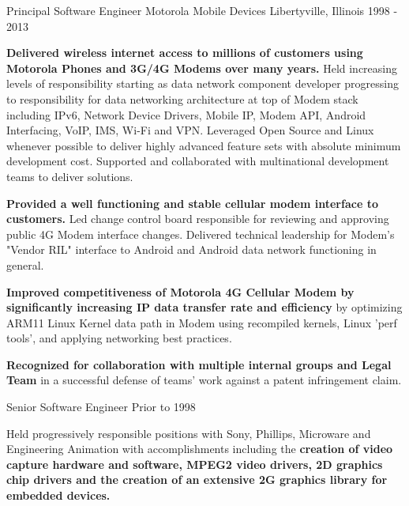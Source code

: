 \begin{cventries}
  \cventry
    {Principal Software Engineer} %
    {Motorola Mobile Devices} %
    {Libertyville, Illinois} %
    {1998 - 2013} %
    {
      \begin{cvitems} %
      \item {\textbf{Delivered wireless internet access to millions of customers
        using Motorola Phones and 3G/4G Modems over many years.}
          Held increasing levels of responsibility starting as data network
          component developer progressing to responsibility for data networking
          architecture at top of Modem stack including IPv6, Network Device
          Drivers, Mobile IP, Modem API, Android Interfacing, VoIP, IMS, Wi-Fi and VPN.
          Leveraged Open Source and Linux whenever possible to deliver highly advanced feature sets with absolute minimum development cost.
          Supported and collaborated with multinational development teams to deliver solutions.}
        \item {\textbf{Provided a well functioning and stable cellular modem interface to customers.}
  Led change control board responsible for reviewing and approving public 4G Modem interface changes.  
  Delivered technical leadership for Modem's "Vendor RIL" interface to Android and Android data network functioning in general.}
        \item {\textbf{Improved competitiveness of Motorola 4G Cellular Modem by significantly increasing IP data transfer rate and efficiency} 
          by optimizing ARM11 Linux Kernel data path in Modem using recompiled kernels, Linux 'perf tools', and applying networking best practices.}
        \item {\textbf{Recognized for collaboration with multiple internal groups and Legal Team }
           in a successful defense of teams' work against a patent infringement claim.
           }
      \end{cvitems}
    }

  \cventry
    {Senior Software Engineer} %
    {Prior to 1998} %
    {} %
    {} %
    {
      \begin{cvitems} %
        \item {Held progressively responsible positions with Sony, Phillips,
          Microware and Engineering Animation with accomplishments including the
          \textbf{creation of video capture hardware and software, MPEG2 video
          drivers, 2D graphics chip drivers and the creation of an extensive 2G
          graphics library for embedded devices.}}
        \end{cvitems}
    }

\end{cventries}
